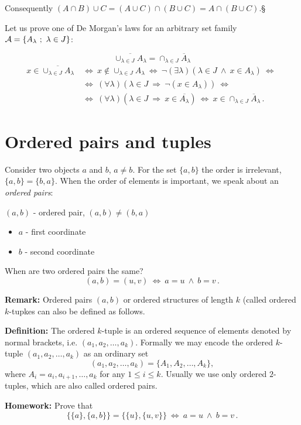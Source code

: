 \documentclass[11pt,paper=b5,footinclude,headinclude]{scrbook} %
\def\inn {{~\wedge~}}
\def\sledi {{~\Rightarrow~}}
\def\cee {{~\Leftrightarrow~}}
\def\kz{{\hfill{\S}}}%
\theoremstyle{remark}
\theoremstyle{definition} %
\theoremstyle{theorem} %
\begin{document}
Consequently
$(A\cap B)\cup C = (A\cup C)\cap (B\cup C) = A\cap (B\cup C)$.\kz


\bigskip

Let us prove one of De Morgan's laws for an arbitrary set family
${\cal A} = \{A_\lambda~;~\lambda\in J\}$:

$$\overline{\cup_{\lambda\in J}A_\lambda} = {\cap_{\lambda\in J}\overline A_\lambda}$$
\begin{align*}
    x\in \overline{\cup_{\lambda\in J}A_\lambda}
& \cee
x\not\in \cup_{\lambda\in J}A_\lambda
\cee
\neg(\exists \lambda)(\lambda \in J\inn x\in A_\lambda)
\cee 
\\
&\cee(\forall \lambda)(\lambda \in J\sledi \neg(x\in A_\lambda))
\cee \\
& \cee
(\forall \lambda)(\lambda \in J\sledi x\in \overline{A_\lambda})
\cee
x\in {\cap_{\lambda\in J}\overline A_\lambda}\,.
\end{align*}

\section{Ordered pairs and tuples}

Consider two objects $a$ and $b$, $a\neq b$.
For the set $\{a,b\}$ the order is irrelevant, $\{a,b\} = \{b,a\}$.
When the order of elements is important, we speak about an {\em ordered pairs}:

$(a,b)$ - ordered pair, $(a,b)\neq (b,a)$
\begin{itemize}
    \item $a$ - first coordinate
    \item $b$ - second coordinate
\end{itemize}
When are two ordered pairs the same?
$$(a,b) = (u,v) \cee a = u \inn b = v\,.$$

\medskip
\textbf{ Remark:}
Ordered pairs $(a,b)$ or ordered structures of length $k$ (called ordered $k$-tupkes can also be defined as follows.
\medskip

\textbf{Definition:} 
The ordered $k$-tuple is an ordered sequence of elements denoted by normal brackets, i.e. $(a_1,a_2,\dots,a_k)$.
Formally we may encode the ordered $k$-tuple $(a_1,a_2,\dots,a_k)$ as an ordinary set
\[
(a_1,a_2,\dots,a_k)=\{A_1,A_2,\dots,A_k\},
\]
where $A_i={a_i,a_{i+1},\dots,a_k}$ for any $1\le i\le k$. 
Usually we use only ordered $2$-tuples, which are also called ordered pairs.

\medskip
\textbf{ Homework:}
Prove that $$\{\{a\},\{a,b\}\} = \{\{u\},\{u,v\}\}\cee a = u \inn b = v\,.$$
\end{document}
